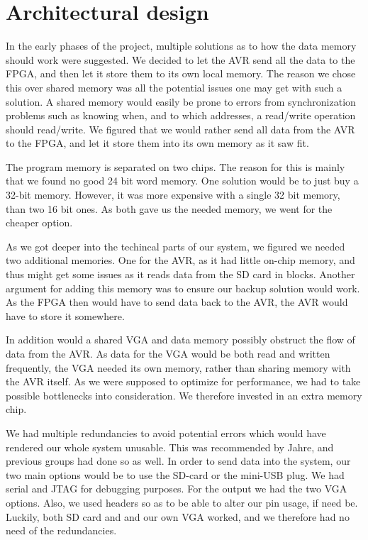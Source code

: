 \section {Architectural design}
 In the early phases of the project,
multiple solutions as to how the data memory should work were suggested. We
decided to let the AVR send all the data to the FPGA, and then let it store them
to its own local memory. The reason we chose this over shared memory was all the
potential issues one may get with such a solution. A shared memory would easily
be prone to errors from synchronization problems such as knowing when, and to
which addresses, a read/write operation should read/write. We figured that we
would rather send all data from the AVR to the FPGA, and let it store them into
its own memory as it saw fit.

The program memory is
separated on two chips. The reason for this is mainly that we found no good 24
bit word memory. One solution would be to just buy a 32-bit memory. However, it
was more expensive with a single 32 bit memory, than two 16 bit ones. As both
gave us the needed memory, we went for the cheaper option.

 As we got deeper into the techincal parts of our
system, we figured we needed two additional memories. One for the AVR, as it had
little on-chip memory, and thus might get some issues as it reads data from the
SD card in blocks. Another argument for adding this memory was to
ensure our backup solution would work. As the FPGA then would have to send data
back to the AVR, the AVR would have to store it somewhere.

In addition would a shared VGA and data memory possibly obstruct the flow of
data from the AVR. As data for the VGA would be both read and written
frequently, the VGA needed its own memory, rather than sharing memory with the
AVR itself. As we were supposed to optimize for performance, we had to take
possible bottlenecks into consideration. We therefore invested in an extra
memory chip.

 We had multiple redundancies to avoid potential
errors which would have rendered our whole system unusable. This was recommended
by Jahre, and previous groups had done so as well. In order to send data into
the system, our two main options would be to use the SD-card or the mini-USB
plug. We had serial and JTAG for debugging purposes. For the output we had the
two VGA options. Also, we used headers so as to be able to alter our pin usage,
if need be. Luckily, both SD card and and our own VGA worked, and we
therefore had no need of the redundancies. 
